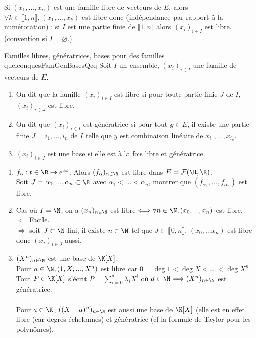 \documentclass[12pt, a4paper]{report}
\begin{document}
\begin{remarque}{}

\begin{remarque}{}
Si $(x_1,...,x_n)$ est une famille libre de vecteurs de $E$, alors $\forall k \in \llbracket 1,n \rrbracket, (x_1,...,x_k)$ est libre donc (indépendance par rapport à la numérotation) : si $I$ est une partie finie de $\llbracket 1, n \rrbracket$ alors $(x_i)_{i \in I}$ est libre. (convention si $I = \varnothing$.)
\end{remarque}

\begin{definition}{Familles libres, génératrices, bases pour des familles quelconques}{FamGenBasesQcq}
Soit $I$ un ensemble, $(x_i)_{i \in I}$ une famille de vecteurs de $E$.
\begin{enumerate}
	\item On dit que la famille $(x_i)_{i \in I}$ est libre si pour toute partie finie $J$ de $I$, $(x_i)_{i \in J}$ est libre.
	\item On dit que $(x_i)_{i \in I}$ est génératrice si pour tout $y \in E$, il existe une partie finie $J = {i_1,...,i_n}$ de $I$ telle que $y$ est combinaison linéaire de $x_{i_1},...,x_{i_n}$.
	\item $(x_i)_{i \in I}$ est une base si elle est à la fois libre et génératrice.
\end{enumerate}
\end{definition}

\begin{exemple}[Exemples]{}
\begin{enumerate}
	\item $f_{\alpha} : t \in \R \mapsto e^{\alpha t}$. Alors $(f_\alpha)_{\alpha \in \R}$ est libre dans $E = \mathcal{F}(\R,\R)$. \\
	Soit $J = {\alpha_1,...,\alpha_n} \subset \R$ avec $\alpha_1<...<\alpha_n$, montrer que $(f_{\alpha_1},...,f_{\alpha_n})$ est libre.
	
	\item Cas où $I = \N$, on a $(x_n)_{n \in \N}$ est libre $\Longleftrightarrow \forall n \in \N, (x_0,...,x_n)$ est libre. \\
	$\Longleftarrow$ Facile. \\
	$\Longrightarrow$ soit $J \subset \N$ fini, il existe $n \in \N$ tel que $J \subset \llbracket 0,n \rrbracket$, $(x_0,...x_n)$ est libre donc $(x_i)_{i \in J}$ aussi.
	
	\item $(X^n)_{n \in \N}$ est une base de $\K[X]$. \\
	Pour $n \in \N, (1,X,...,X^n)$ est libre car $0 = \deg 1 < \deg X < ... < \deg X^n$. \\
	Tout $P \in \K[X]$ s'écrit $P = \displaystyle{\sum_{i=0}^{d} \lambda_i X^i}$ où $d \in \N \Longrightarrow (X^n)_{n \in \N}$ est génératrice. \\ \\
	Pour $a \in \K$, $((X-a)^n)_{n \in \N}$ est aussi une base de $\K[X]$ (elle est en effet libre (car degrés échelonnés) et génératrice (cf la formule de Taylor pour les polynômes).
\end{enumerate}
\end{exemple}


\end{remarque}
\end{document}
